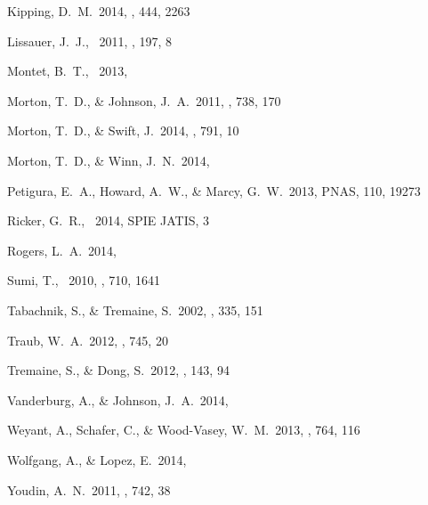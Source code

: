 \documentclass[letterpaper,12pt,preprint]{hack_aastex}
\begin{document}
\begin{multicols}{2}
\begin{thebibliography}{}
Kipping, D.~M.\ 2014, \mnras, 444, 2263

Lissauer, J.~J., \etal\ 2011, \apjs, 197, 8

Montet, B.~T., \etal\ 2013, 

Morton, T.~D., \& Johnson, J.~A.\ 2011, \apj, 738, 170

Morton, T.~D., \& Swift, J.\ 2014, \apj, 791, 10

Morton, T.~D., \& Winn, J.~N.\ 2014, 

Petigura, E.~A., Howard, A.~W., \& Marcy, G.~W.\ 2013, PNAS, 110, 19273

Ricker, G.~R., \etal\ 2014, SPIE JATIS, 3

Rogers, L.~A.\ 2014, 

Sumi, T., \etal\ 2010, \apj, 710, 1641

Tabachnik, S., \& Tremaine, S.\ 2002, \mnras, 335, 151

Traub, W.~A.\ 2012, \apj, 745, 20

Tremaine, S., \& Dong, S.\ 2012, \aj, 143, 94

Vanderburg, A., \& Johnson, J.~A.\ 2014, 

Weyant, A., Schafer, C., \& Wood-Vasey, W.~M.\ 2013, \apj, 764, 116

Wolfgang, A., \& Lopez, E.\ 2014, 

Youdin, A.~N.\ 2011, \apj, 742, 38

\end{thebibliography}
\end{multicols}
\end{document}
